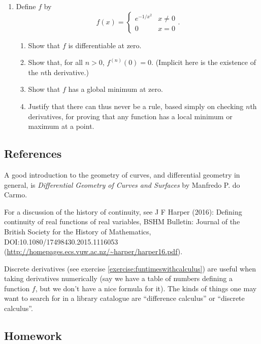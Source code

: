 \begin{enumerate}
\begin{enumerate}
    \end{enumerate}
  \item Define $ f $ by
        \begin{displaymath}
          f(x) = \begin{cases} e^{-1/x^2} & x \neq 0 \\ 0 &x = 0 \end{cases}.
        \end{displaymath}
    \begin{enumerate}
      \item Show that $ f $ is differentiable at zero.
      \item Show that, for all $ n > 0 $, $ f^{(n)}(0) = 0 $. (Implicit here is the existence of the $ n$th derivative.)
      \item Show that $ f $ has a global minimum at zero.
      \item Justify that there can thus never be a rule, based simply on checking $ n$th derivatives, for proving
            that any function has a local minimum or maximum at a point.
      \end{enumerate}
\end{enumerate}

\subsection{References}
A good introduction to the geometry of curves, and differential geometry in general, is \emph{Differential Geometry
of Curves and Surfaces} by Manfredo P. do Carmo.

For a discussion of the history of continuity, see J F Harper (2016): Defining continuity of
real functions of real variables, BSHM Bulletin: Journal of the British Society for the History
of Mathematics, DOI:10.1080/17498430.2015.1116053 (\url{http://homepages.ecs.vuw.ac.nz/~harper/harper16.pdf}).

Discrete derivatives (see exercise \ref{exercise:funtimeswithcalculus}) are useful when taking
derivatives numerically (say we have a table of numbers defining a function $ f $, but we don't
have a nice formula for it). The kinds of things one may want to search for in a library catalogue
are ``difference calculus'' or ``discrete calculus''.

\subsection{Homework}
